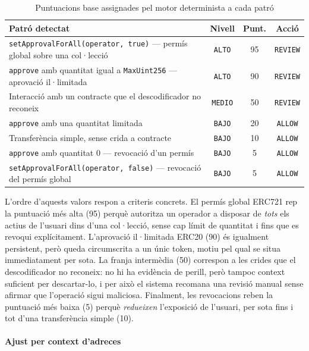 \begin{table}[H]
\centering
\small
\renewcommand{\arraystretch}{1.4}
\setlength{\tabcolsep}{8pt}
\begin{tabularx}{\textwidth}{X | c | c | c}
\hline
\textbf{Patró detectat} & \textbf{Nivell} & \textbf{Punt.} & \textbf{Acció} \\
\hline
\texttt{setApprovalForAll(operator, true)} — permís global sobre una col·lecció &
\texttt{ALTO} & 95 & \texttt{REVIEW} \\
\hline
\texttt{approve} amb quantitat igual a \texttt{MaxUint256} — aprovació il·limitada &
\texttt{ALTO} & 90 & \texttt{REVIEW} \\
\hline
Interacció amb un contracte que el descodificador no reconeix &
\texttt{MEDIO} & 50 & \texttt{REVIEW} \\
\hline
\texttt{approve} amb una quantitat limitada &
\texttt{BAJO} & 20 & \texttt{ALLOW} \\
\hline
Transferència simple, sense crida a contracte &
\texttt{BAJO} & 10 & \texttt{ALLOW} \\
\hline
\texttt{approve} amb quantitat 0 — revocació d'un permís &
\texttt{BAJO} & 5 & \texttt{ALLOW} \\
\hline
\texttt{setApprovalForAll(operator, false)} — revocació del permís global &
\texttt{BAJO} & 5 & \texttt{ALLOW} \\
\hline
\end{tabularx}
\caption{Puntuacions base assignades pel motor determinista a cada patró}
\label{tab:escala_risc}
\end{table}

L'ordre d'aquests valors respon a criteris concrets. El permís global ERC721 rep la puntuació més alta (95) perquè autoritza un operador a disposar de \textit{tots} els actius de l'usuari dins d'una col·lecció, sense cap límit de quantitat i fins que es revoqui explícitament. L'aprovació il·limitada ERC20 (90) és igualment persistent, però queda circumscrita a un únic token, motiu pel qual se situa immediatament per sota. La franja intermèdia (50) correspon a les crides que el descodificador no reconeix: no hi ha evidència de perill, però tampoc context suficient per descartar-lo, i per això el sistema recomana una revisió manual sense afirmar que l'operació sigui maliciosa. Finalment, les revocacions reben la puntuació més baixa (5) perquè \textit{redueixen} l'exposició de l'usuari, per sota fins i tot d'una transferència simple (10).

\paragraph{Ajust per context d'adreces}

